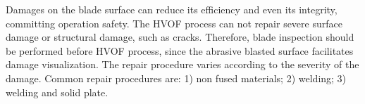 
Damages on the blade surface can reduce its efficiency and even its integrity,
committing operation safety. The HVOF process can not repair severe surface
damage or structural damage, such as cracks. Therefore, blade inspection should
be performed before HVOF process, since the abrasive blasted surface facilitates
damage visualization.
The repair procedure varies according to the severity of
the damage. Common repair procedures are: 1) non fused materials; 2) welding;  
3) welding and solid plate.


